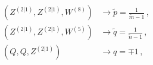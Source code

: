 \begin{equation}
\begin{aligned}
(Z^{(2|1)},Z^{(2|1)}, W^{(8)}) &\rightarrow \tilde p =
\frac{1}{\tilde{m}-1}\, ,\\[1ex]
(Z^{(2|1)},Z^{(2|1)}, W^{(5)}) &\rightarrow \tilde q =
\frac{1}{\tilde{n}-1}\, ,\\[1ex]
(Q,Q,Z^{(2|1)}) &\rightarrow q=\mp 1\, ,
\end{aligned}
\end{equation}

